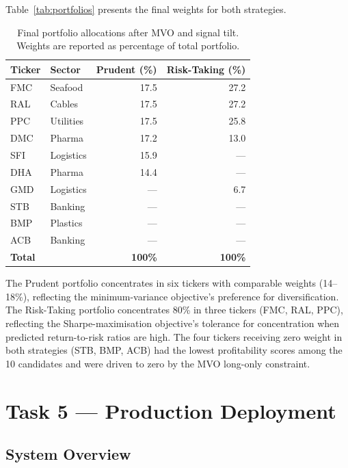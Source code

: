 \documentclass[12pt, a4paper]{article}
\begin{document}
Table~\ref{tab:portfolios} presents the final weights for both strategies.

\begin{table}[h]
\centering
\caption{Final portfolio allocations after MVO and signal tilt.
         Weights are reported as percentage of total portfolio.}
\label{tab:portfolio_alloc}
\renewcommand{\arraystretch}{1.3}
\begin{tabular}{llrr}
\hline
\textbf{Ticker} & \textbf{Sector}
  & \textbf{Prudent (\%)} & \textbf{Risk-Taking (\%)} \\
\hline
FMC & Seafood    & 17.5 & 27.2 \\
RAL & Cables     & 17.5 & 27.2 \\
PPC & Utilities  & 17.5 & 25.8 \\
DMC & Pharma     & 17.2 & 13.0 \\
SFI & Logistics  & 15.9 & --- \\
DHA & Pharma     & 14.4 & --- \\
GMD & Logistics  & --- & 6.7 \\
STB & Banking    & --- & --- \\
BMP & Plastics   & --- & --- \\
ACB & Banking    & --- & --- \\
\hline
\textbf{Total}  & & \textbf{100\%} & \textbf{100\%} \\
\hline
\end{tabular}
\end{table}

The Prudent portfolio concentrates in six tickers with
comparable weights (14--18\%), reflecting the minimum-variance
objective's preference for diversification. The Risk-Taking
portfolio concentrates 80\% in three tickers (FMC, RAL, PPC),
reflecting the Sharpe-maximisation objective's tolerance for
concentration when predicted return-to-risk ratios are high.
The four tickers receiving zero weight in both strategies
(STB, BMP, ACB) had the lowest profitability scores among
the 10 candidates and were driven to zero by the MVO
long-only constraint.


\section{Task 5 --- Production Deployment}

\subsection{System Overview}
\end{document}
